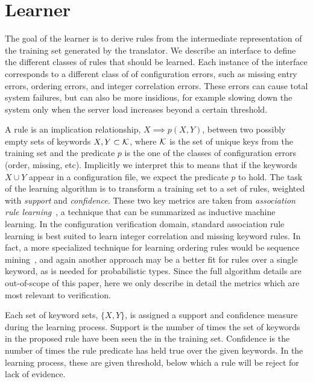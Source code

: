 \section{Learner}
\label{sec-learn}

The goal of the learner is to derive rules from the intermediate representation of the training set generated by the translator.
We describe an interface to define the different classes of rules that should be learned.
Each instance of the interface corresponds to a different class of of configuration errors, such as missing entry errors, ordering errors, and integer correlation errors. 
These errors can cause total system failures, but can also be more insidious, for example slowing down the system only when the server load increases beyond a certain threshold.


A rule is an implication relationship, $X \implies p(X,Y)$, between two possibly empty sets of keywords $X,Y \subset \mathcal{K}$, where $\mathcal{K}$ is the set of unique keys from the training set and the predicate $p$ is the one of the classes of configuration errors (order, missing, etc).
Implicitly we interpret this to means that if the keywords $X\cup Y$ appear in a configuration file, we expect the predicate $p$ to hold.
The task of the learning algorithm is to transform a training set to a set of rules, weighted with \textit{support} and \textit{confidence}.
These two key metrics are taken from \textit{association rule learning}~\cite{agrawal1993mining}, a technique that can be summarized as inductive machine learning.
In the configuration verification domain, standard association rule learning is best suited to learn integer correlation and missing keyword rules.
In fact, a more specialized technique for learning ordering rules would be sequence mining~\cite{}, and again another approach may be a better fit for rules over a single keyword, as is needed for probabilistic types.
Since the full algorithm details are out-of-scope of this paper, here we only describe in detail the metrics which are most relevant to verification.

Each set of keyword sets, $\{X,Y\}$, is assigned a support and confidence measure during the learning process.
Support is the number of times the set of keywords in the proposed rule have been seen the in the training set.
Confidence is the number of times the rule predicate has held true over the given keywords.
In the learning process, these are given threshold, below which a rule will be reject for lack of evidence.

